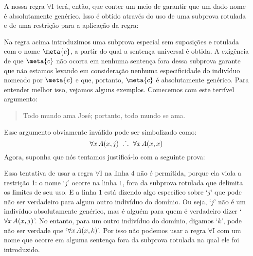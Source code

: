 A nossa regra $\forall$I terá, então, que conter um meio de garantir que um dado nome é absolutamente genérico.
Isso é obtido através do uso de uma subprova rotulada e de uma restrição para a aplicação da regra:


 Na regra acima introduzimos uma subprova especial sem suposições e rotulada com o nome $\meta{c}$, a partir do qual a sentença universal é obtida.
 A exigência de que $\meta{c}$ não ocorra em nenhuma sentença fora dessa subprova garante que não estamos levando em consideração nenhuma especificidade do indivíduo nomeado por $\meta{c}$ e que, portanto, $\meta{c}$ é absolutamente genérico.
 Para entender melhor isso, vejamos alguns exemplos.
 Comecemos com este terrível argumento:  
 
	\begin{quote}
		Todo mundo ama José; portanto, todo mundo se ama.
	\end{quote}
Esse argumento obviamente inválido pode ser simbolizado como:
$$\forall x\,\mathord{A}(x,j) \ \mathrel{\ldotp\dot{}\,\ldotp} \ \forall x\,\mathord{A}(x,x)$$
Agora, suponha que nós tentamos justificá-lo com a seguinte prova:
\begin{fitchproof}
	\open
		 
	\close
	 
\end{fitchproof}\noindent
Essa tentativa de usar a regra $\forall$I na linha $4$ não é permitida, porque ela viola a restrição 1:
o nome `$j$' ocorre na linha $1$, fora da subprova rotulada que delimita os limites de seu uso.
E a linha $1$ está dizendo algo específico sobre `$j$' que pode não ser verdadeiro para algum outro indivíduo do domínio.
Ou seja, `$j$' não é um indivíduo absolutamente genérico, mas é alguém para quem é verdadeiro dizer  `$\forall x\, \mathord{A}(x,j)$'.
No entanto, para um outro indivíduo do domínio, digamos `$k$', pode não ser verdade que `$\forall x\, \mathord{A}(x,k)$'.
Por isso não podemos usar a regra $\forall$I com um nome que ocorre em alguma sentença fora da subprova rotulada na qual ele foi introduzido.


